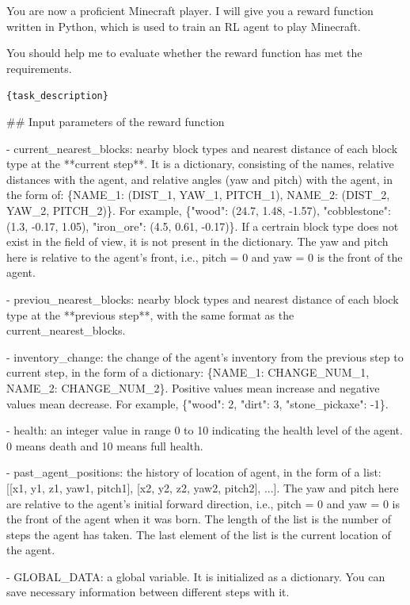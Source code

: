 

You are now a proficient Minecraft player. I will give you a reward function written in Python, which is used to train an RL agent to play Minecraft. 

You should help me to evaluate whether the reward function has met the requirements.



\texttt{\{task\_description\}}



\#\# Input parameters of the reward function

- current\_nearest\_blocks: nearby block types and nearest distance of each block type at the **current step**. It is a dictionary, consisting of the names, relative distances with the agent, and relative angles (yaw and pitch) with the agent, in the form of: \{NAME\_1: (DIST\_1, YAW\_1, PITCH\_1), NAME\_2: (DIST\_2, YAW\_2, PITCH\_2)\}. For example, \{"wood": (24.7, 1.48, -1.57), "cobblestone": (1.3, -0.17, 1.05), "iron\_ore": (4.5, 0.61, -0.17)\}. If a certrain block type does not exist in the field of view, it is not present in the dictionary. The yaw and pitch here is relative to the agent's front, i.e., pitch = 0 and yaw = 0 is the front of the agent.

- previou\_nearest\_blocks: nearby block types and nearest distance of each block type at the **previous step**, with the same format as the current\_nearest\_blocks.

- inventory\_change: the change of the agent's inventory from the previous step to current step, in the form of a dictionary: \{NAME\_1: CHANGE\_NUM\_1, NAME\_2: CHANGE\_NUM\_2\}. Positive values mean increase and negative values mean decrease. For example, \{"wood": 2, "dirt": 3, "stone\_pickaxe": -1\}.

- health: an integer value in range 0 to 10 indicating the health level of the agent. 0 means death and 10 means full health.

- past\_agent\_positions: the history of location of agent, in the form of a list: [[x1, y1, z1, yaw1, pitch1], [x2, y2, z2, yaw2, pitch2], ...]. The yaw and pitch here are relative to the agent's initial forward direction, i.e., pitch = 0 and yaw = 0 is the front of the agent when it was born. The length of the list is the number of steps the agent has taken. The last element of the list is the current location of the agent.

- GLOBAL\_DATA: a global variable. It is initialized as a dictionary. You can save necessary information between different steps with it.





